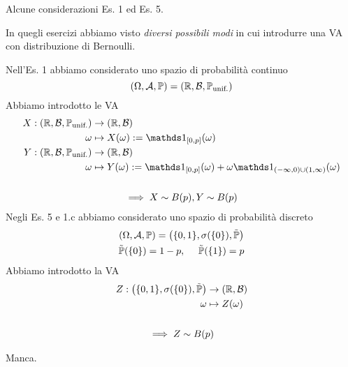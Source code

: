 \begin{oss}
Alcune considerazioni Es. 1 ed Es. 5.

In quegli esercizi abbiamo visto \textit{diversi possibili modi} in cui introdurre una VA con distribuzione di Bernoulli.

Nell'Es. 1 abbiamo considerato uno spazio di probabilità continuo
\begin{equation*}
( \Omega ,\mathcal{A} ,\mathbb{P}) =(\mathbb{R} ,\mathcal{B} ,\mathbb{P}_{\text{unif.}})
\end{equation*}
Abbiamo introdotto le VA
\begin{gather*}
\begin{aligned}
X:(\mathbb{R} ,\mathcal{B} ,\PP_{\text{unif.}}) & \rightarrow (\mathbb{R} ,\mathcal{B})\\
\omega  & \mapsto X( \omega ) :=\Ind_{[ 0,p]}( \omega )\\
Y:(\mathbb{R} ,\mathcal{B} ,\PP_{\text{unif.}}) & \rightarrow (\mathbb{R} ,\mathcal{B})\\
\omega  & \mapsto Y( \omega ) :=\Ind_{[ 0,p]}( \omega ) +\omega \Ind_{( -\infty ,0) \cup ( 1,\infty )}( \omega )
\end{aligned}\\
\ \\
\implies X\sim B( p) ,Y\sim B( p)
\end{gather*}
Negli Es. 5 e 1.c abbiamo considerato uno spazio di probabilità discreto
\begin{gather*}
( \Omega ,\mathcal{A} ,\mathbb{P}) =\left(\{0,1\} ,\sigma (\{0\}) ,\tilde{\mathbb{P}}\right)\\
\tilde{\mathbb{P}}(\{0\}) =1-p,\ \ \ \ \tilde{\mathbb{P}}(\{1\}) =p
\end{gather*}
Abbiamo introdotto la VA
\begin{gather*}
\begin{aligned}
Z:\left(\{0,1\} ,\sigma (\{0\}) ,\tilde{\mathbb{P}}\right) & \rightarrow (\mathbb{R} ,\mathcal{B})\\
\omega  & \mapsto Z( \omega )
\end{aligned}\\
\\
\implies Z\sim B( p)
\end{gather*}
\end{oss}
\Soluzione

Manca.
\Soluzione


